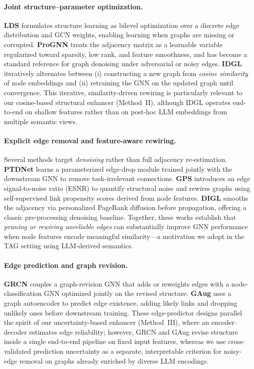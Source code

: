 \documentclass{article}
\begin{document}
\paragraph{Joint structure--parameter optimization.}
\textbf{LDS} \citep{franceschi2019lds} formulates structure learning as bilevel
optimization over a discrete edge distribution and GCN weights, enabling learning
when graphs are missing or corrupted. \textbf{ProGNN} \citep{jin2020prognn} treats
the adjacency matrix as a learnable variable regularized toward sparsity, low rank,
and feature smoothness, and has become a standard reference for graph denoising under
adversarial or noisy edges. \textbf{IDGL} \citep{chen2020idgl} iteratively alternates
between (i) constructing a new graph from \emph{cosine similarity} of node embeddings
and (ii) retraining the GNN on the updated graph until convergence. This iterative,
similarity-driven rewiring is particularly relevant to our cosine-based structural
enhancer (Method~II), although IDGL operates end-to-end on shallow features rather
than on post-hoc LLM embeddings from multiple semantic views.

\paragraph{Explicit edge removal and feature-aware rewiring.}
Several methods target \emph{denoising} rather than full adjacency re-estimation.
\textbf{PTDNet} \citep{luo2021ptdnet} learns a parameterized edge-drop module trained
jointly with the downstream GNN to remove task-irrelevant connections.
\textbf{GPS} \citep{dong2023gps} introduces an edge signal-to-noise ratio (ESNR) to
quantify structural noise and rewires graphs using self-supervised link propensity
scores derived from node features. \textbf{DIGL} \citep{klicpera2019digl} smooths
the adjacency via personalized PageRank diffusion before propagation, offering a
classic pre-processing denoising baseline. Together, these works establish that
\emph{pruning or rewiring unreliable edges} can substantially improve GNN performance
when node features encode meaningful similarity---a motivation we adopt in the
TAG setting using LLM-derived semantics.

\paragraph{Edge prediction and graph revision.}
\textbf{GRCN} \citep{yu2020grcn} couples a graph-revision GNN that adds or reweights
edges with a node-classification GNN optimized jointly on the revised structure.
\textbf{GAug} \citep{zhao2021gaug} uses a graph autoencoder to predict edge existence,
adding likely links and dropping unlikely ones before downstream training. These
edge-predictor designs parallel the spirit of our uncertainty-based enhancer
(Method~III), where an encoder--decoder estimates edge reliability; however, GRCN
and GAug revise structure inside a single end-to-end pipeline on fixed input features,
whereas we use cross-validated prediction uncertainty as a separate, interpretable
criterion for noisy-edge removal on graphs already enriched by diverse LLM encodings.
\end{document}
